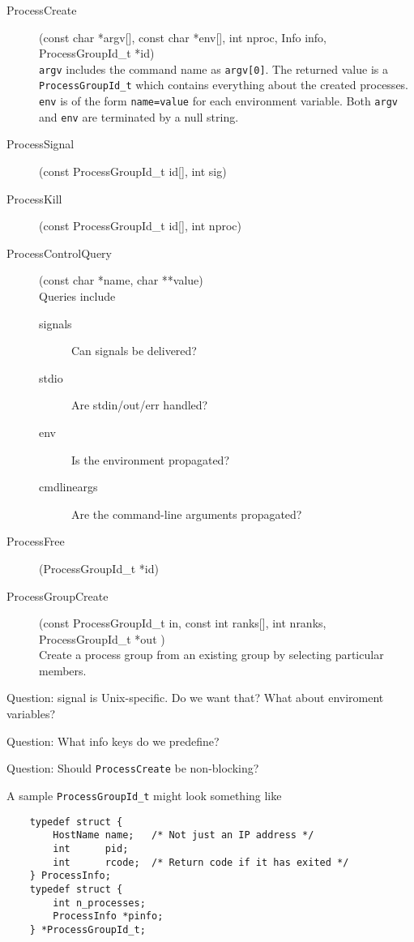 \documentclass{article}
\let\code=\texttt
\begin{document}
\begin{description}
\item[ProcessCreate](const char *argv[], const char *env[], 
                     int nproc, Info info,
    ProcessGroupId\_t *id)\\
\code{argv} includes the command name as \code{argv[0]}.  The returned value
    is a \code{ProcessGroupId\_t} which contains everything about the created
    processes. 
    \code{env} is of the form \code{name=value} for each environment variable.
    Both \code{argv} and \code{env} are terminated by a null string.
\item[ProcessSignal](const ProcessGroupId\_t id[], int sig)\\
\item[ProcessKill](const ProcessGroupId\_t id[], int nproc)\\
\item[ProcessControlQuery](const char *name, char **value)\\
      Queries include
      \begin{description}
      \item[signals]Can signals be delivered?
      \item[stdio]Are stdin/out/err handled?
      \item[env]Is the environment propagated?
      \item[cmdlineargs]Are the command-line arguments propagated?
      \end{description}
\item[ProcessFree](ProcessGroupId\_t *id)\\
\item[ProcessGroupCreate](const ProcessGroupId\_t in, const int ranks[], int
  nranks, ProcessGroupId\_t *out )\\
  Create a process group from an existing group by selecting particular
  members.
\end{description}
Question: signal is Unix-specific.  Do we want that?  What about enviroment
variables? 

Question: What info keys do we predefine?

Question: Should \code{ProcessCreate} be non-blocking?  

A sample \code{ProcessGroupId\_t} might look something like
\begin{verbatim}
    typedef struct {
        HostName name;   /* Not just an IP address */
        int      pid;
        int      rcode;  /* Return code if it has exited */
    } ProcessInfo;
    typedef struct {
        int n_processes;
        ProcessInfo *pinfo;
    } *ProcessGroupId_t;
\end{verbatim}
\end{document}
